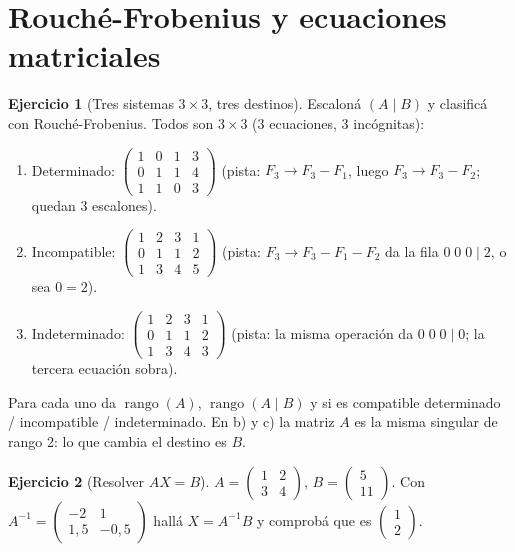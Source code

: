 \documentclass[a4paper,12pt]{article}
\theoremstyle{definition}
\newtheorem{ejercicio}{Ejercicio}[section]
\begin{document}
\section{Rouché-Frobenius y ecuaciones matriciales}
\begin{ejercicio}[Tres sistemas $3 \times 3$, tres destinos]
Escaloná $(A\mid B)$ y clasificá con Rouché-Frobenius. Todos son $3 \times 3$ (3 ecuaciones, 3 incógnitas):
\begin{enumerate}[label=\alph*)]
\item Determinado:
$\left(\begin{array}{ccc|c} 1 & 0 & 1 & 3 \\ 0 & 1 & 1 & 4 \\ 1 & 1 & 0 & 3 \end{array}\right)$
(pista: $F_3 \to F_3-F_1$, luego $F_3 \to F_3-F_2$; quedan 3 escalones).
\item Incompatible:
$\left(\begin{array}{ccc|c} 1 & 2 & 3 & 1 \\ 0 & 1 & 1 & 2 \\ 1 & 3 & 4 & 5 \end{array}\right)$
(pista: $F_3 \to F_3-F_1-F_2$ da la fila $0\;0\;0\mid 2$, o sea $0=2$).
\item Indeterminado:
$\left(\begin{array}{ccc|c} 1 & 2 & 3 & 1 \\ 0 & 1 & 1 & 2 \\ 1 & 3 & 4 & 3 \end{array}\right)$
(pista: la misma operación da $0\;0\;0\mid 0$; la tercera ecuación sobra).
\end{enumerate}
Para cada uno da $\operatorname{rango}(A)$, $\operatorname{rango}(A\mid B)$ y si es compatible determinado / incompatible / indeterminado. En b) y c) la matriz $A$ es la misma singular de rango 2: lo que cambia el destino es $B$.
\end{ejercicio}

\begin{ejercicio}[Resolver $AX=B$]
$A=\begin{pmatrix} 1 & 2 \\ 3 & 4 \end{pmatrix}$, $B=\begin{pmatrix} 5 \\ 11 \end{pmatrix}$. Con $A^{-1}=\begin{pmatrix} -2 & 1 \\ 1{,}5 & -0{,}5 \end{pmatrix}$ hallá $X=A^{-1}B$ y comprobá que es $\begin{pmatrix} 1 \\ 2 \end{pmatrix}$.
\end{ejercicio}
\end{document}
